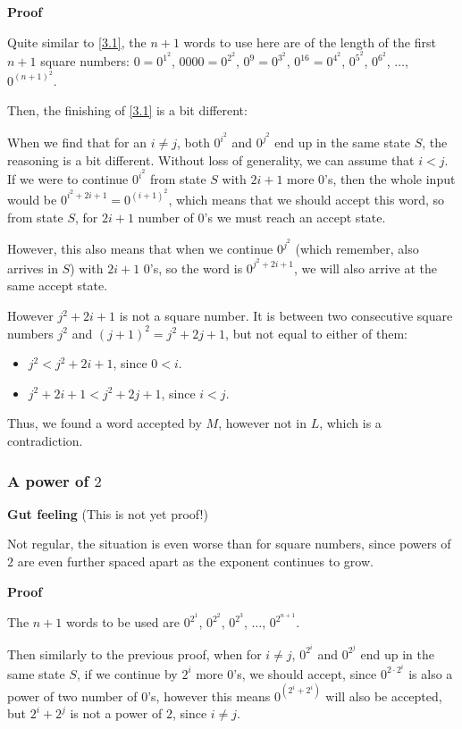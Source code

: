 \textbf{Proof}

 Quite similar to \ref{3.1}, the $n+1$ words to use here are of the length of the first $n+1$ square numbers: $0 = 0^{1^2}$, $0000 = 0^{2^2}$, $0^9 = 0^{3^2}$, $0^{16} = 0^{4^2}$, $0^{5^2}$, $0^{6^2}$, $\dots$, $0^{(n+1)^2}$.
 
Then, the finishing of \ref{3.1} is a bit different:

When we find that for an $i\neq{}j$, both $0^{i^2}$ and $0^{j^2}$ end up in the same state $S$, the reasoning is a bit different. Without loss of generality, we can assume that $i<j$. If we were to continue $0^{i^2}$ from state $S$ with $2i+1$ more $0$'s, then the whole input would be $0^{i^2+2i+1} = 0^{(i+1)^2}$, which means that we should accept this word, so from state $S$, for $2i+1$ number of $0$'s we must reach an accept state.

However, this also means that when we continue $0^{j^2}$ (which remember, also arrives in $S$) with $2i+1$ $0$'s, so the word is $0^{j^2+2i+1}$, we will also arrive at the same accept state.

However $j^2+2i+1$ is not a square number. It is between two consecutive square numbers $j^2$ and $(j+1)^2 = j^2+2j+1$, but not equal to either of them:
\begin{itemize}
    \item $j^2 < j^2 + 2i + 1$, since $0<i$.
    \item $j^2 + 2i + 1 < j^2 + 2j + 1$, since $i<j$.
\end{itemize}

Thus, we found a word accepted by $M$, however not in $L$, which is a contradiction.

\subsubsection{A power of $2$}

\textbf{Gut feeling} (This is not yet proof!)

Not regular, the situation is even worse than for square numbers, since powers of $2$ are even further spaced apart as the exponent continues to grow.

\textbf{Proof}

The $n+1$ words to be used are $0^{2^1}$, $0^{2^2}$, $0^{2^3}$, $\dots$, $0^{2^{n+1}}$.

Then similarly to the previous proof, when for $i\neq{}j$, $0^{2^i}$ and $0^{2^j}$ end up in the same state $S$, if we continue by $2^i$ more $0$'s, we should accept, since $0^{2\cdot{}2^i}$ is also a power of two number of $0$'s, however this means  $0^{(2^i + 2^i)}$ will also be accepted, but $2^i + 2^j$ is not a power of $2$, since $i\neq{}j$.